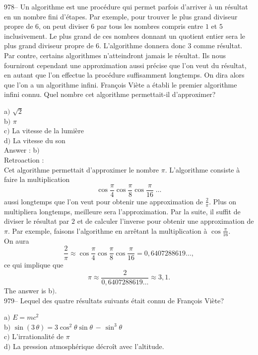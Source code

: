﻿\documentclass[letterpaper, 12pt]{article}
\begin{document}
978-- Un algorithme est une proc\'edure qui permet parfois d'arriver
\`a un r\'esultat en un nombre fini d'\'etapes. Par exemple, pour
trouver le plus grand diviseur propre de $6$, on peut diviser $6$
par tous les nombres compris entre $1$ et $5$ inclusivement. Le plus
grand de ces nombres donnant un quotient entier sera le plus grand
diviseur propre de $6$. L'algorithme donnera donc $3$ comme
r\'esultat. Par contre, certains algorithmes n'atteindront jamais le
r\'esultat. Ils nous fourniront cependant une approximation aussi
pr\'ecise que l'on veut du r\'esultat, en autant que l'on effectue
la proc\'edure suffisamment longtemps. On dira alors que l'on a un
algorithme infini. Fran\c cois Vi\`ete a \'etabli le premier
algorithme infini connu. Quel nombre cet algorithme permettait-il
d'approximer?

a$)$ $\sqrt2$ \\
b$)$ $\pi$ \\
c$)$ La vitesse de la lumi\`ere \\
d$)$ La vitesse du son\\

Answer : b$)$\\

Retroaction : \\
Cet algorithme permettait d'approximer le nombre $\pi$. L'algorithme
consiste \`a faire la multiplication
$$\displaystyle{\cos\frac{\pi}4\cos\frac{\pi}8\cos\frac{\pi}{16}\;\ldots}$$
aussi longtemps que l'on veut pour obtenir une approximation de
$\frac2{\pi}$. Plus on multipliera longtemps, meilleure sera
l'approximation. Par la suite, il suffit de diviser le r\'esultat
par $2$ et de calculer l'inverse
pour obtenir une approximation de $\pi$. Par exemple, faisons l'algorithme
en arr\^etant la multiplication \`a $\cos\frac{\pi}{16}$.\\
On aura
$$
\displaystyle{\frac2{\pi}}  \approx
\displaystyle{\cos\frac{\pi}4\cos\frac{\pi}8\cos\frac{\pi}{16}}
                               =     0,640 728 861 9\ldots,
$$
ce qui implique que
$$
\pi  \approx  \displaystyle{\frac2{0,640 728 861 9\ldots}}
     \approx  3,1.
$$
The answer is b$)$.\\

979-- Lequel des quatre r\'esultats suivants \'etait connu de Fran\c
cois Vi\`ete?

a$)$ $E=mc^2$\\
b$)$ $\sin(3\,\theta)=3\cos^2\theta\sin\theta\,-\,\sin^3\theta$ \\
c$)$ L'irrationalit\'e de $\pi$ \\
d$)$ La pression atmosph\'erique d\'ecro\^it avec l'altitude.\\
\end{document}
